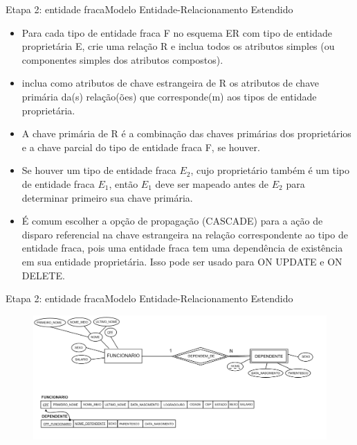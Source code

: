 \documentclass[t]{beamer}
\begin{document}
\begin{ftst}{Etapa 2: entidade fraca}{Modelo Entidade-Relacionamento Estendido}
\small
\begin{itemize}
    \item Para cada tipo de entidade fraca F no esquema ER com tipo de entidade proprietária E, crie uma relação R e inclua todos os atributos simples (ou componentes simples dos atributos compostos).
    \item inclua como atributos de chave estrangeira de R os atributos de chave primária da(s) relação(ões) que corresponde(m) aos tipos de entidade proprietária.
    \item A chave primária de R é a combinação das chaves primárias dos proprietários e a chave parcial do tipo de entidade fraca F, se houver.
    \item Se houver um tipo de entidade fraca $E_2$, cujo proprietário também é um tipo de entidade fraca $E_1$, então $E_1$ deve ser mapeado antes de $E_2$ para determinar primeiro sua chave primária.
    \item É comum escolher a opção de propagação (CASCADE) para a ação de disparo referencial na chave estrangeira na relação correspondente ao tipo de entidade fraca, pois uma entidade fraca tem uma dependência de existência em sua entidade proprietária. Isso pode ser usado para ON UPDATE e ON DELETE.
    
\end{itemize}
\end{ftst}


\begin{ftst}{Etapa 2: entidade fraca}{Modelo Entidade-Relacionamento Estendido}
\vone
\vone
\begin{figure}
    \centering
    \includegraphics[scale=0.11]{Figuras/03_04.png}
\end{figure}
\end{ftst}
\end{document}
